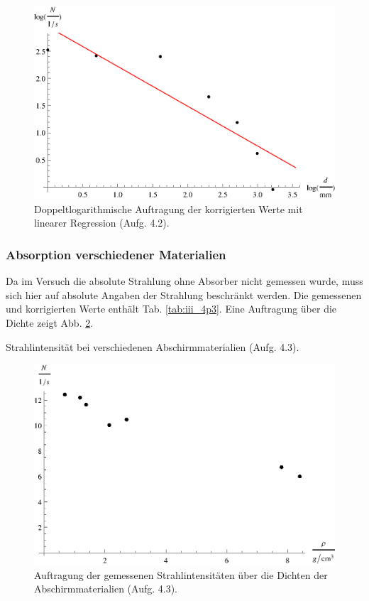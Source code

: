 \begin{figure}[tb]
	\centering
	\includegraphics[scale=1.0]{fig/iii_4p2.eps}
	\caption{Doppeltlogarithmische Auftragung der korrigierten Werte mit linearer Regression (Aufg. 4.2).}
	\label{fig:iii_4p2}
\end{figure}

\subsubsection{Absorption verschiedener Materialien}
Da im Versuch die absolute Strahlung ohne Absorber nicht gemessen wurde, muss sich hier auf absolute Angaben der Strahlung beschränkt werden. Die gemessenen und korrigierten Werte enthält Tab. \ref{tab:iii_4p3}. Eine Auftragung über die Dichte zeigt Abb. \ref{fig:iii_4p3}.

\begin{table}[tb]
	\centering
	\caption{Strahlintensität bei verschiedenen Abschirmmaterialien (Aufg. 4.3).}
	\label{tab:iii_4p3}
	
\end{table}

\begin{figure}[tb]
	\centering
	\includegraphics[scale=1.0]{fig/iii_4p3.eps}
	\caption{Auftragung der gemessenen Strahlintensitäten über die Dichten der Abschirmmaterialien (Aufg. 4.3).}
	\label{fig:iii_4p3}
\end{figure}